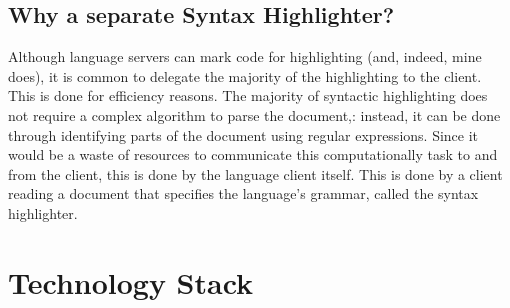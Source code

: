 \documentclass[../main.tex]{subfiles}
\begin{document}
\subsection{Why a separate Syntax Highlighter?}
Although language servers can mark code for highlighting (and, indeed, mine does), it is common to delegate the majority of the highlighting to the client. This is done for efficiency reasons. The majority of syntactic highlighting does not require a complex algorithm to parse the document,: instead, it can be done through identifying parts of the document using regular expressions. Since it would be a waste of resources to communicate this computationally task to and from the client, this is done by the language client itself. This is done by a client reading a document that specifies the language's grammar, called the syntax highlighter.
%
%
%
\section{Technology Stack}
\end{document}
